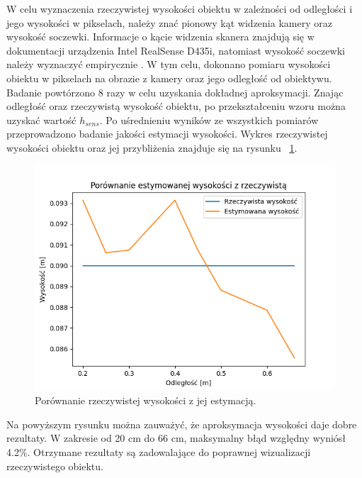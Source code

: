 W celu wyznaczenia rzeczywistej wysokości obiektu w zależności od odległości i jego wysokości w pikselach, należy znać pionowy kąt widzenia kamery oraz wysokość soczewki. Informacje o kącie widzenia skanera znajdują się w dokumentacji urządzenia Intel RealSense D435i, natomiast wysokość soczewki należy wyznaczyć empirycznie \cite{IntelRealSenseSheet}. W tym celu, dokonano pomiaru wysokości obiektu w pikselach na obrazie z kamery oraz jego odległość od obiektywu. Badanie powtórzono 8 razy w celu uzyskania dokładnej aproksymacji. Znając odległość oraz rzeczywistą wysokość obiektu, po przekształceniu wzoru można uzyskać wartość $h_{sens}$. Po uśrednieniu wyników ze wszystkich pomiarów przeprowadzono badanie jakości estymacji wysokości. Wykres rzeczywistej wysokości obiektu oraz jej przybliżenia znajduje się na rysunku ~\ref{fig:wysokoscOdleglosc}.
\begin{figure}[H]
  \centering
    \includegraphics[scale=0.55]{wysokoscPredykcja.png}
  \caption{Porównanie rzeczywistej wysokości z jej estymacją.}   
  \label{fig:wysokoscOdleglosc}
\end{figure}
Na powyższym rysunku można zauważyć, że aproksymacja wysokości daje dobre rezultaty. W zakresie od 20 cm do 66 cm, maksymalny błąd względny wyniósł 4.2\%. Otrzymane rezultaty są zadowalające do poprawnej wizualizacji rzeczywistego obiektu.
